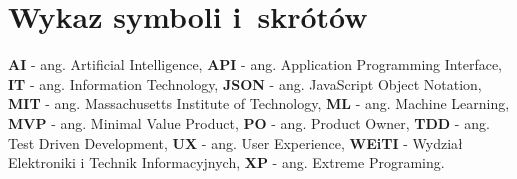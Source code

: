 \chapter*{Wykaz symboli i~skrótów}

\noindent
\textbf{AI} - ang. Artificial Intelligence, \newline
\textbf{API} - ang. Application Programming Interface, \newline
\textbf{IT} - ang. Information Technology, \newline
\textbf{JSON} - ang. JavaScript Object Notation, \newline
\textbf{MIT} - ang. Massachusetts Institute of Technology, \newline
\textbf{ML} - ang. Machine Learning, \newline
\textbf{MVP} - ang. Minimal Value Product, \newline
\textbf{PO} - ang. Product Owner, \newline
\textbf{TDD} - ang. Test Driven Development, \newline
\textbf{UX} - ang. User Experience, \newline
\textbf{WEiTI} - Wydział Elektroniki i Technik Informacyjnych, \newline
\textbf{XP} - ang. Extreme Programing. \newline

\cleardoublepage